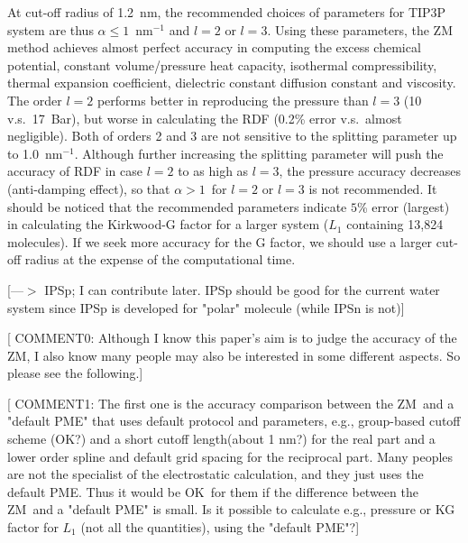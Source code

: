 \documentclass[a4paper,preprint,unsortedaddress,onecolumn,fleqn]{revtex4}
\begin{document}
At cut-off radius of 1.2~nm, the recommended choices of
parameters for TIP3P system are thus $\alpha \leq 1$~$\text{nm}^{-1}$ and $%
l=2$ or $l=3$. Using these parameters, the ZM method achieves almost perfect
accuracy in computing the excess chemical potential, constant
volume/pressure heat capacity, isothermal compressibility, thermal expansion
coefficient, dielectric constant diffusion constant and viscosity. The order 
$l=2$ performs better in reproducing the pressure than $l=3$ (10
v.s.~17~Bar), but worse in calculating the RDF (0.2\% error v.s.~almost
negligible). Both of orders 2 and 3 are not sensitive to the splitting
parameter up to 1.0~$\text{nm}^{-1}$. Although further
increasing the splitting parameter will push the accuracy of RDF in case $%
l=2 $ to as high as $l=3$, the pressure accuracy decreases (anti-damping
effect), so that $\alpha >1$\ for $l=2$ or $l=3$ is not recommended. It
should be noticed that the recommended parameters indicate $5$\% error
(largest) in calculating the Kirkwood-G factor for a larger system ($L_{1}$
containing 13,824 molecules).  If we seek more
accuracy for the G factor, we should use a larger cut-off radius at the
expense of the computational time. 

[{\color{blue}---$>$ IPSp; I can contribute later. IPSp should be good for
the current water system since IPSp is developed for "polar" molecule (while
IPSn is not)}]

[ {\color{blue} COMMENT0: Although I know this paper's aim is to judge the
accuracy of the ZM, I also know many people may also be interested in some
different aspects. So please see the following.}]

[ {\color{blue} COMMENT1: The first one is the accuracy comparison between
the ZM\ and a "default PME" that uses default protocol and parameters, e.g.,
group-based cutoff scheme (OK?) and a short cutoff length(about 1 nm?) for
the real part and a lower order spline and default grid spacing for the
reciprocal part. Many peoples are not the specialist of the electrostatic
calculation, and they just uses the default PME. Thus it would be OK\ for
them if the difference between the ZM\ and a "default PME" is small. Is it
possible to calculate e.g., pressure or KG factor for {$L_{1}$} (n{ot all
the quantities}), using the {"default PME"?}}]
\end{document}
